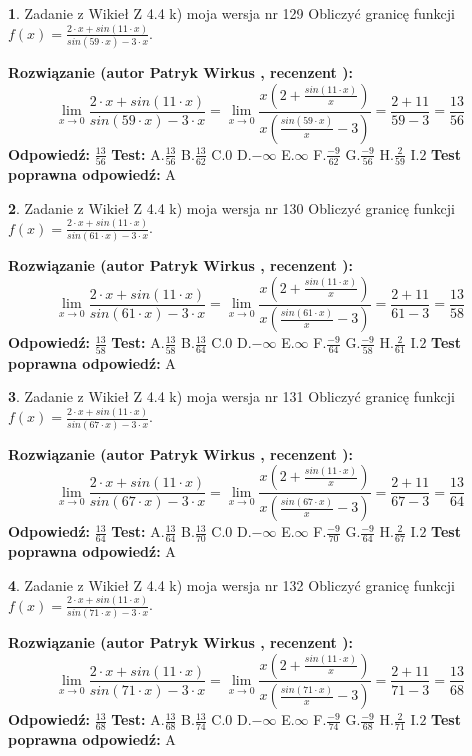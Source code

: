 \documentclass[12pt, a4paper]{article}
\theoremstyle{definition} %
\newtheorem{zad}{}
\newcommand{\zadStart}[1]{\begin{zad}#1\newline}
\newcommand{\zadStop}{\end{zad}}
\newcommand{\rozwStart}[2]{\noindent \textbf{Rozwiązanie (autor #1 , recenzent #2): }\newline}
\newcommand{\rozwStop}{\newline}
\newcommand{\odpStart}{\noindent \textbf{Odpowiedź:}\newline}
\newcommand{\odpStop}{\newline}
\newcommand{\testStart}{\noindent \textbf{Test:}\newline}
\newcommand{\testStop}{\newline}
\newcommand{\kluczStart}{\noindent \textbf{Test poprawna odpowiedź:}\newline}
\newcommand{\kluczStop}{\newline}
\begin{document}
\zadStart{Zadanie z Wikieł Z 4.4 k) moja wersja nr 129}
Obliczyć granicę funkcji $f(x)=\frac{2\cdot x +sin(11\cdot x)}{sin(59\cdot x) -3\cdot x}$.
\zadStop
\rozwStart{Patryk Wirkus}{}
$$\lim\limits_{x\to 0}\frac{2\cdot x +sin(11\cdot x)}{sin(59\cdot x) -3\cdot x}
=\lim\limits_{x\to 0}\frac{x(2+\frac{sin(11\cdot x)}{x})}{x(\frac{sin(59\cdot x)}{x}-3)}
=\frac{2+11}{59-3} = \frac{13}{56}$$
\rozwStop
\odpStart
$\frac{13}{56}$
\odpStop
\testStart
A.$\frac{13}{56}$
B.$\frac{13}{62}$
C.$0$
D.$-\infty$
E.$\infty$
F.$\frac{-9}{62}$
G.$\frac{-9}{56}$
H.$\frac{2}{59}$
I.$2$
\testStop
\kluczStart
A
\kluczStop



\zadStart{Zadanie z Wikieł Z 4.4 k) moja wersja nr 130}
Obliczyć granicę funkcji $f(x)=\frac{2\cdot x +sin(11\cdot x)}{sin(61\cdot x) -3\cdot x}$.
\zadStop
\rozwStart{Patryk Wirkus}{}
$$\lim\limits_{x\to 0}\frac{2\cdot x +sin(11\cdot x)}{sin(61\cdot x) -3\cdot x}
=\lim\limits_{x\to 0}\frac{x(2+\frac{sin(11\cdot x)}{x})}{x(\frac{sin(61\cdot x)}{x}-3)}
=\frac{2+11}{61-3} = \frac{13}{58}$$
\rozwStop
\odpStart
$\frac{13}{58}$
\odpStop
\testStart
A.$\frac{13}{58}$
B.$\frac{13}{64}$
C.$0$
D.$-\infty$
E.$\infty$
F.$\frac{-9}{64}$
G.$\frac{-9}{58}$
H.$\frac{2}{61}$
I.$2$
\testStop
\kluczStart
A
\kluczStop



\zadStart{Zadanie z Wikieł Z 4.4 k) moja wersja nr 131}
Obliczyć granicę funkcji $f(x)=\frac{2\cdot x +sin(11\cdot x)}{sin(67\cdot x) -3\cdot x}$.
\zadStop
\rozwStart{Patryk Wirkus}{}
$$\lim\limits_{x\to 0}\frac{2\cdot x +sin(11\cdot x)}{sin(67\cdot x) -3\cdot x}
=\lim\limits_{x\to 0}\frac{x(2+\frac{sin(11\cdot x)}{x})}{x(\frac{sin(67\cdot x)}{x}-3)}
=\frac{2+11}{67-3} = \frac{13}{64}$$
\rozwStop
\odpStart
$\frac{13}{64}$
\odpStop
\testStart
A.$\frac{13}{64}$
B.$\frac{13}{70}$
C.$0$
D.$-\infty$
E.$\infty$
F.$\frac{-9}{70}$
G.$\frac{-9}{64}$
H.$\frac{2}{67}$
I.$2$
\testStop
\kluczStart
A
\kluczStop



\zadStart{Zadanie z Wikieł Z 4.4 k) moja wersja nr 132}
Obliczyć granicę funkcji $f(x)=\frac{2\cdot x +sin(11\cdot x)}{sin(71\cdot x) -3\cdot x}$.
\zadStop
\rozwStart{Patryk Wirkus}{}
$$\lim\limits_{x\to 0}\frac{2\cdot x +sin(11\cdot x)}{sin(71\cdot x) -3\cdot x}
=\lim\limits_{x\to 0}\frac{x(2+\frac{sin(11\cdot x)}{x})}{x(\frac{sin(71\cdot x)}{x}-3)}
=\frac{2+11}{71-3} = \frac{13}{68}$$
\rozwStop
\odpStart
$\frac{13}{68}$
\odpStop
\testStart
A.$\frac{13}{68}$
B.$\frac{13}{74}$
C.$0$
D.$-\infty$
E.$\infty$
F.$\frac{-9}{74}$
G.$\frac{-9}{68}$
H.$\frac{2}{71}$
I.$2$
\testStop
\kluczStart
A
\kluczStop
\end{document}
